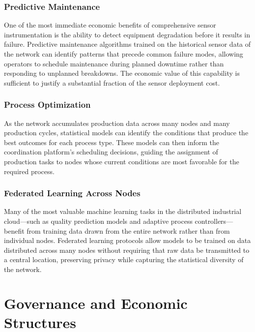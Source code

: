 \documentclass[12pt]{book}
\theoremstyle{definition}
\theoremstyle{remark}
\begin{document}
\section{Predictive Maintenance}

One of the most immediate economic benefits of comprehensive sensor
instrumentation is the ability to detect equipment degradation before
it results in failure. Predictive maintenance algorithms trained on
the historical sensor data of the network can identify patterns that
precede common failure modes, allowing operators to schedule
maintenance during planned downtime rather than responding to
unplanned breakdowns. The economic value of this capability is
sufficient to justify a substantial fraction of the sensor deployment
cost.

\section{Process Optimization}

As the network accumulates production data across many nodes and
many production cycles, statistical models can identify the
conditions that produce the best outcomes for each process type.
These models can then inform the coordination platform's scheduling
decisions, guiding the assignment of production tasks to nodes whose
current conditions are most favorable for the required process.

\section{Federated Learning Across Nodes}

Many of the most valuable machine learning tasks in the distributed
industrial cloud---such as quality prediction models and adaptive
process controllers---benefit from training data drawn from the
entire network rather than from individual nodes. Federated learning
protocols allow models to be trained on data distributed across many
nodes without requiring that raw data be transmitted to a central
location, preserving privacy while capturing the statistical
diversity of the network.

\part{Governance and Economic Structures}
\end{document}
